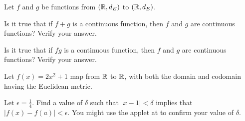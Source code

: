\item Let $f$ and $g$ be functions from $(\mathbb{R},d_E)$ to $(\mathbb{R},d_E)$. 

\ba

\item Is it true that if $f+g$ is a continuous function, then $f$ and $g$ are continuous functions? Verify your answer.

\item Is it true that if $fg$ is a continuous function, then $f$ and $g$ are continuous functions? Verify your answer. 

\ea

\begin{comment}

\ExerciseSolution

\ba

\item The answer is no. Let $f: \R \to \R$ with the Euclidean metric on both the domain and codomain be defined by $f(x) = \begin{cases} 1 &\text{ if } x \geq 0 \\ 0 &\text{ if } x < 0. \end{cases}$. Let $g(x) = -f(x)$ for all $x \in \R$. Then $f+g$ is the constant function $0$ and so $f+g$ is a continuous function. However, the function $f$ is not continuous at $x=0$. To see why, let $\epsilon = \frac{1}{2}$. For any $\delta > 0$, if $x \in (0, \delta)$, then $f(x) = 1$. So $|x - 0| < \delta$ does not imply that $|f(x)-f(0)| < \epsilon$.   

\item Again, the answer is no. Let $f(x)$ be as in part (a) and let $g(x) = \begin{cases} 0 &\text{ if } x \geq 0 \\ 0 &\text{ if } x < 1. \end{cases}$. Then $fg$ is the constant function $0$ but $f$ is not continuous at $x=0$.

\ea


\end{comment}


\item Let $f(x) = 2x^2+1$ map from $\mathbb{R}$ to $\mathbb{R}$, with both the domain and codomain having the Euclidean metric.

	\ba
	
	\item Let $\epsilon = \frac{1}{4}$. Find a value of $\delta$ such that $|x-1| < \delta$ implies that $|f(x)-f(a)| < \epsilon$. You might use the applet at  to confirm your value of $\delta$. 
	
